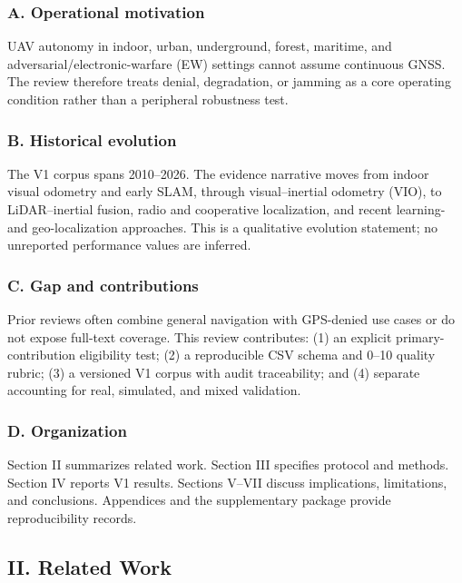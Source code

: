 \documentclass[
  journal,
  10pt]{IEEEtran}
\begin{document}
\subsubsection{A. Operational
motivation}\label{a-operational-motivation}

UAV autonomy in indoor, urban, underground, forest, maritime, and
adversarial/electronic-warfare (EW) settings cannot assume continuous
GNSS. The review therefore treats denial, degradation, or jamming as a
core operating condition rather than a peripheral robustness test.

\subsubsection{B. Historical evolution}\label{b-historical-evolution}

The V1 corpus spans 2010--2026. The evidence narrative moves from indoor
visual odometry and early SLAM, through visual--inertial odometry (VIO),
to LiDAR--inertial fusion, radio and cooperative localization, and
recent learning- and geo-localization approaches. This is a qualitative
evolution statement; no unreported performance values are inferred.

\subsubsection{C. Gap and contributions}\label{c-gap-and-contributions}

Prior reviews often combine general navigation with GPS-denied use cases
or do not expose full-text coverage. This review contributes: (1) an
explicit primary-contribution eligibility test; (2) a reproducible CSV
schema and 0--10 quality rubric; (3) a versioned V1 corpus with audit
traceability; and (4) separate accounting for real, simulated, and mixed
validation.

\subsubsection{D. Organization}\label{d-organization}

Section II summarizes related work. Section III specifies protocol and
methods. Section IV reports V1 results. Sections V--VII discuss
implications, limitations, and conclusions. Appendices and the
supplementary package provide reproducibility records.

\subsection{II. Related Work}\label{ii-related-work}
\end{document}
